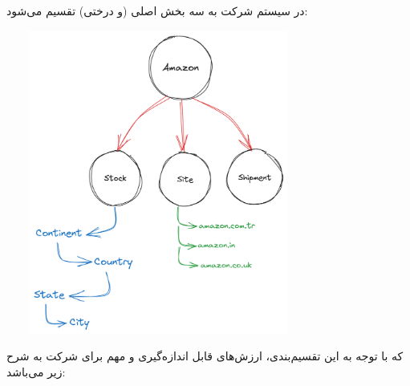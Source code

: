 \documentclass[12pt]{article}
\begin{document}
در سیستم  شرکت  به سه بخش اصلی (و درختی) تقسیم می‌شود:
\begin{center}
    \includegraphics[width=0.75\textwidth, height=10cm]{../images/amazon-s3-comp(2)}
\end{center}

که با توجه به این تقسیم‌بندی، ارزش‌های قابل‌ اندازه‌گیری \label{movs}
و مهم برای شرکت  به شرح زیر می‌باشد:
\end{document}
